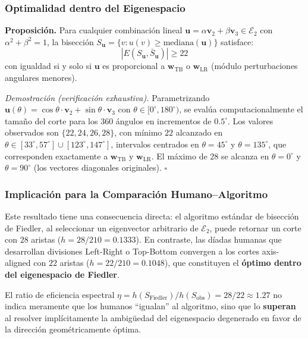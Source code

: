 \documentclass[conference]{IEEEtran}
\begin{document}
\subsubsection{Optimalidad dentro del Eigenespacio}

\textbf{Proposición.} Para cualquier combinación lineal $\mathbf{u} = \alpha \mathbf{v}_2 + \beta \mathbf{v}_3 \in \mathcal{E}_2$ con $\alpha^2 + \beta^2 = 1$, la bisección $S_{\mathbf{u}} = \{v : u(v) \geq \text{mediana}(\mathbf{u})\}$ satisface:
\begin{equation}
    |E(S_{\mathbf{u}}, \bar{S}_{\mathbf{u}})| \geq 22
\end{equation}
con igualdad si y solo si $\mathbf{u}$ es proporcional a $\mathbf{w}_{\text{TB}}$ o $\mathbf{w}_{\text{LR}}$ (módulo perturbaciones angulares menores).

\textit{Demostración (verificación exhaustiva).} Parametrizando $\mathbf{u}(\theta) = \cos\theta \cdot \mathbf{v}_2 + \sin\theta \cdot \mathbf{v}_3$ con $\theta \in [0^\circ, 180^\circ)$, se evalúa computacionalmente el tamaño del corte para los 360 ángulos en incrementos de $0.5^\circ$. Los valores observados son $\{22, 24, 26, 28\}$, con mínimo $22$ alcanzado en $\theta \in [33^\circ, 57^\circ] \cup [123^\circ, 147^\circ]$, intervalos centrados en $\theta = 45^\circ$ y $\theta = 135^\circ$, que corresponden exactamente a $\mathbf{w}_{\text{TB}}$ y $\mathbf{w}_{\text{LR}}$. El máximo de $28$ se alcanza en $\theta = 0^\circ$ y $\theta = 90^\circ$ (los vectores diagonales originales). $\square$

\subsubsection{Implicación para la Comparación Humano--Algoritmo}

Este resultado tiene una consecuencia directa: el algoritmo estándar de bisección de Fiedler, al seleccionar un eigenvector arbitrario de $\mathcal{E}_2$, puede retornar un corte con $28$ aristas ($h = 28/210 = 0.1333$). En contraste, las díadas humanas que desarrollan divisiones Left-Right o Top-Bottom convergen a los cortes axis-aligned con $22$ aristas ($h = 22/210 = 0.1048$), que constituyen el \textbf{óptimo dentro del eigenespacio de Fiedler}.

El ratio de eficiencia espectral $\eta = h(S_{\text{Fiedler}})/h(S_{\text{obs}}) = 28/22 \approx 1.27$ no indica meramente que los humanos ``igualan'' al algoritmo, sino que lo \textbf{superan} al resolver implícitamente la ambigüedad del eigenespacio degenerado en favor de la dirección geométricamente óptima.
\end{document}
